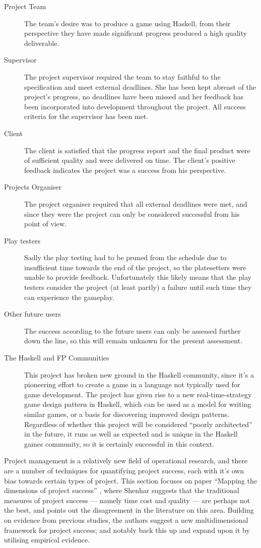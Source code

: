 \begin{description}
    \item[Project Team] The team's desire was to produce a game using Haskell, from their perspective they have made significant progress produced a high quality deliverable.
    \item[Supervisor] The project supervisor required the team to stay faithful to the specification and meet external deadlines. She has been kept abreast of the project's progress, no deadlines have been missed and her feedback has been incorporated into development throughout the project. All success criteria for the supervisor has been met.
    \item[Client] The client is satisfied that the progress report and the final product were of sufficient quality and were delivered on time. The client's positive feedback indicates the project was a success from his perspective.
    \item[Projects Organiser] The project organiser required that all external deadlines were met, and since they were the project can only be considered successful from his point of view.
    \item[Play testers] Sadly the play testing had to be pruned from the schedule due to insufficient time towards the end of the project, so the platesetters were unable to provide feedback. Unfortunately this likely means that the play testers consider the project (at least partly) a failure until such time they can experience the gameplay.
    \item[Other future users] The success according to the future users can only be assessed further down the line, so this will remain unknown for the present assessment.
    \item[The Haskell and FP Communities] This project has broken new ground in the Haskell community, since it's a pioneering effort to create a game in a language not typically used for game development. The project has given rise to a new real-time-strategy game design pattern in Haskell, which can be used as a model for writing similar games, or a basis for discovering improved design patterns. Regardless of whether this project will be considered ``poorly architected'' in the future, it runs as well as expected and is unique in the Haskell games community, so it is certainly successful in this context.
\end{description}

\noindent Project management is a relatively new field of operational research, and there are a number of techniques for quantifying project success, each with it's own bias towards certain types of project. This section focuses on paper ``Mapping the dimensions of project success'' \cite{shenhar}, where Shenhar suggests that the traditional measures of project success --- namely time cost and quality --- are perhaps not the best, and points out the disagreement in the literature on this area. Building on evidence from previous studies, the authors suggest a new multidimensional framework for project success; and notably back this up and expand upon it by utilising empirical evidence.

